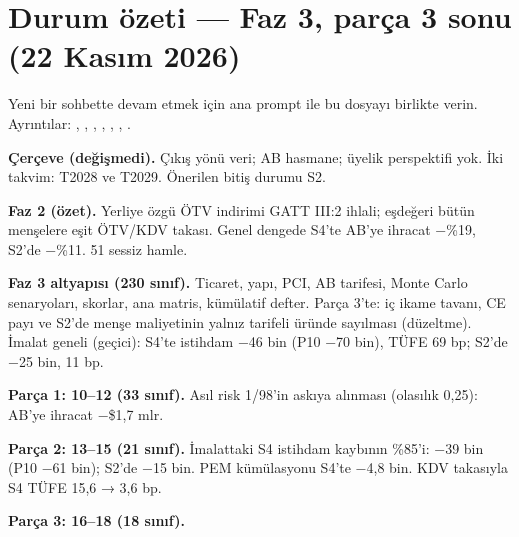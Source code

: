 \hypertarget{DURUM_OZETI}{%
\chapter{Durum özeti --- Faz 3, parça 3 sonu (22 Kasım 2026)}\label{DURUM_OZETI}}

Yeni bir sohbette devam etmek için ana prompt ile bu dosyayı birlikte verin. Ayrıntılar: , , , , , , .

\textbf{Çerçeve (değişmedi).} Çıkış yönü veri; AB hasmane; üyelik perspektifi yok. İki takvim: T2028 ve T2029. Önerilen bitiş durumu S2.

\textbf{Faz 2 (özet).} Yerliye özgü ÖTV indirimi GATT III:2 ihlali; eşdeğeri bütün menşelere eşit ÖTV/KDV takası. Genel dengede S4'te AB'ye ihracat −\%19, S2'de −\%11. 51 sessiz hamle.

\textbf{Faz 3 altyapısı (230 sınıf).} Ticaret, yapı, PCI, AB tarifesi, Monte Carlo senaryoları, skorlar, ana matris, kümülatif defter. Parça 3'te: iç ikame tavanı, CE payı ve S2'de menşe maliyetinin yalnız tarifeli üründe sayılması (düzeltme). İmalat geneli (geçici): S4'te istihdam −46 bin (P10 −70 bin), TÜFE 69 bp; S2'de −25 bin, 11 bp.

\textbf{Parça 1: 10--12 (33 sınıf).} Asıl risk 1/98'in askıya alınması (olasılık 0,25): AB'ye ihracat −\$1,7 mlr.

\textbf{Parça 2: 13--15 (21 sınıf).} İmalattaki S4 istihdam kaybının \%85'i: −39 bin (P10 −61 bin); S2'de −15 bin. PEM kümülasyonu S4'te −4,8 bin. KDV takasıyla S4 TÜFE 15,6 → 3,6 bp.

\textbf{Parça 3: 16--18 (18 sınıf).}

